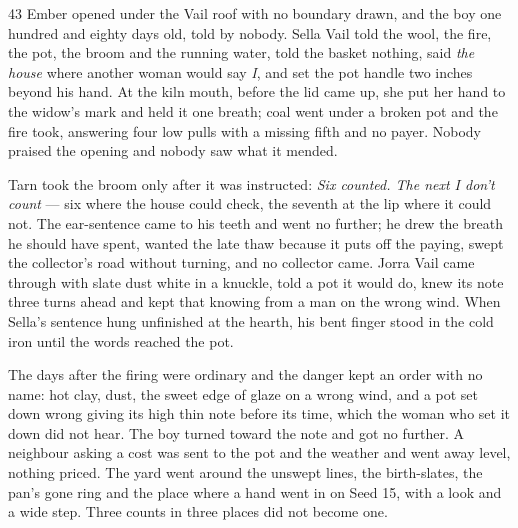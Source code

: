 
\scenebreak


\scenebreak


\scenebreak

\CRtailpiece
\begin{CRchronicle}{43}
Ember opened under the Vail roof with no boundary drawn, and the boy one hundred and eighty days old, told by nobody. Sella Vail told the wool, the fire, the pot, the broom and the running water, told the basket nothing, said \emph{the house} where another woman would say \emph{I}, and set the pot handle two inches beyond his hand. At the kiln mouth, before the lid came up, she put her hand to the widow’s mark and held it one breath; coal went under a broken pot and the fire took, answering four low pulls with a missing fifth and no payer. Nobody praised the opening and nobody saw what it mended.

Tarn took the broom only after it was instructed: \emph{Six counted. The next I don’t count} --- six where the house could check, the seventh at the lip where it could not. The ear-sentence came to his teeth and went no further; he drew the breath he should have spent, wanted the late thaw because it puts off the paying, swept the collector’s road without turning, and no collector came. Jorra Vail came through with slate dust white in a knuckle, told a pot it would do, knew its note three turns ahead and kept that knowing from a man on the wrong wind. When Sella’s sentence hung unfinished at the hearth, his bent finger stood in the cold iron until the words reached the pot.

The days after the firing were ordinary and the danger kept an order with no name: hot clay, dust, the sweet edge of glaze on a wrong wind, and a pot set down wrong giving its high thin note before its time, which the woman who set it down did not hear. The boy turned toward the note and got no further. A neighbour asking a cost was sent to the pot and the weather and went away level, nothing priced. The yard went around the unswept lines, the birth-slates, the pan’s gone ring and the place where a hand went in on Seed 15, with a look and a wide step. Three counts in three places did not become one.


\end{CRchronicle}
